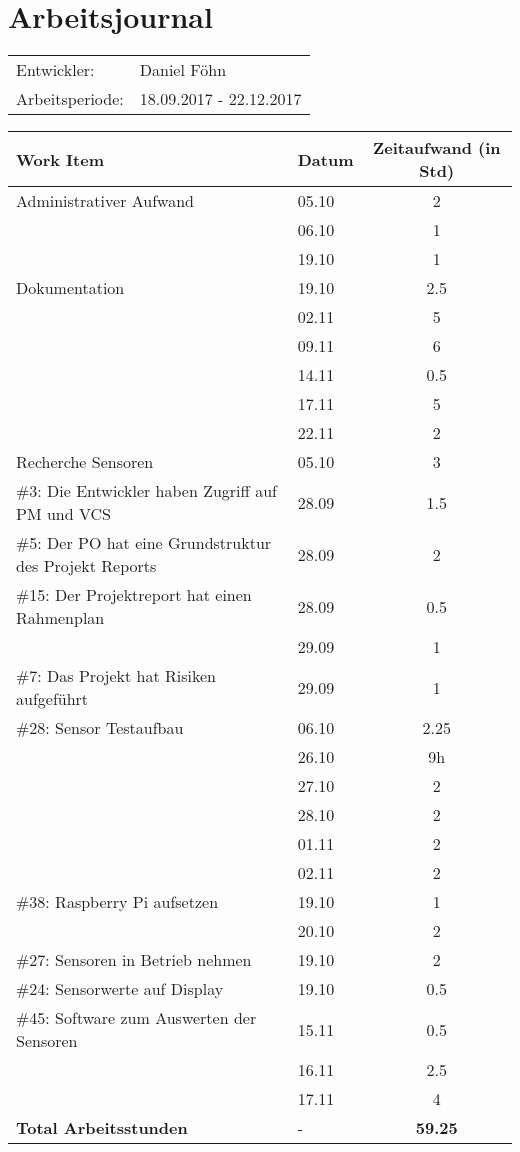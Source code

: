 \documentclass[a4paper, 10pt, fleqn]{article}
\newcommand{\header}{\textbf{Work Item}&\textbf{Datum}&\textbf{Zeitaufwand (in Std)}\\\toprule}
\newcommand{\footer}{\midrule\textbf{Total Arbeitsstunden}&-&\textbf{59.25}\\\midrule\bottomrule}
\begin{document}
	\section*{Arbeitsjournal}
    \begin{tabular}{ll}
        Entwickler: & Daniel Föhn \\
        Arbeitsperiode: & 18.09.2017 - 22.12.2017\\
    \end{tabular}

	\begin{table}[H]
		\centering
		\begin{tabular}{p{9cm}|p{2cm}|c}
            \header

            Administrativer Aufwand & 05.10 & 2\\
            & 06.10 & 1\\
            & 19.10 & 1\\
            
            Dokumentation & 19.10 & 2.5\\
            & 02.11 & 5\\
            & 09.11 & 6\\
            & 14.11 & 0.5\\
            & 17.11 & 5\\
            & 22.11 & 2\\
            
            Recherche Sensoren & 05.10 & 3\\
            \#3: Die Entwickler haben Zugriff auf PM und VCS& 28.09 & 1.5\\
            \#5: Der PO hat eine Grundstruktur des Projekt Reports& 28.09 & 2\\
            \#15: Der Projektreport hat einen Rahmenplan & 28.09 & 0.5\\
            & 29.09 & 1\\
            \#7: Das Projekt hat Risiken aufgeführt & 29.09 & 1\\
            \#28: Sensor Testaufbau & 06.10 & 2.25\\
            & 26.10 & 9h \\
            & 27.10 & 2\\
            & 28.10 & 2\\
            & 01.11 & 2\\
            & 02.11 & 2\\
            \#38: Raspberry Pi aufsetzen & 19.10 & 1\\
            & 20.10 & 2\\
            \#27: Sensoren in Betrieb nehmen & 19.10 & 2\\
            \#24: Sensorwerte auf Display & 19.10 & 0.5\\
            \#45: Software zum Auswerten der Sensoren & 15.11 & 0.5\\
            & 16.11 & 2.5\\
            & 17.11 & 4\\
            \footer
		\end{tabular}
	\end{table}
\end{document}
